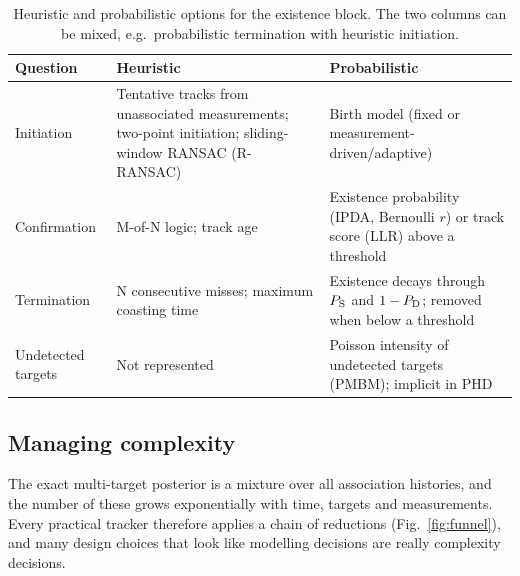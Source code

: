 \begin{table}[htbp]
\centering\small
\caption{Heuristic and probabilistic options for the existence block.
  The two columns can be mixed, e.g.\ probabilistic termination with
  heuristic initiation.}
\label{tab:existence}
\begin{tabularx}{\textwidth}{>{\raggedright\arraybackslash}p{2.2cm} X X}
\toprule
Question & Heuristic & Probabilistic \\
\midrule
Initiation   & Tentative tracks from unassociated measurements; two-point initiation; sliding-window RANSAC (R-RANSAC) & Birth model (fixed or measurement-driven/adaptive) \\
Confirmation & M-of-N logic; track age & Existence probability (IPDA, Bernoulli $r$) or track score (LLR) above a threshold \\
Termination  & N consecutive misses; maximum coasting time & Existence decays through $P_{\mathrm{S}}$ and $1-P_{\mathrm{D}}$; removed when below a threshold \\
Undetected targets & Not represented & Poisson intensity of undetected targets (PMBM); implicit in PHD \\
\bottomrule
\end{tabularx}
\end{table}

\subsection{Managing complexity}
\label{sec:complexity}

The exact multi-target posterior is a mixture over all association histories, and the number of these grows exponentially with time, targets and measurements. Every practical tracker therefore applies a chain of reductions (Fig.~\ref{fig:funnel}), and many design choices that look like modelling decisions are really complexity decisions.


